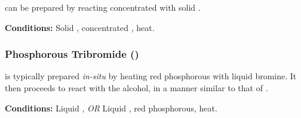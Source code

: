 
				 can be prepared by reacting concentrated  with solid .

				\vspace{1.5em}
				\vbox{\textbf{Conditions:}	\tabto{35mm}Solid , concentrated , heat.}



			\subsubsection{Phosphorous Tribromide ()}

				 is typically prepared \textit{in-situ} by heating red phosphorous with liquid bromine. It then proceeds to
				react with the alcohol, in a manner similar to that of .

				\vspace{1.5em}
				\vbox{\textbf{Conditions:}	\tabto{35mm}Liquid , \textit{OR}
											\tabto{35mm}Liquid , {\color{Red}red} phosphorous, heat.}





